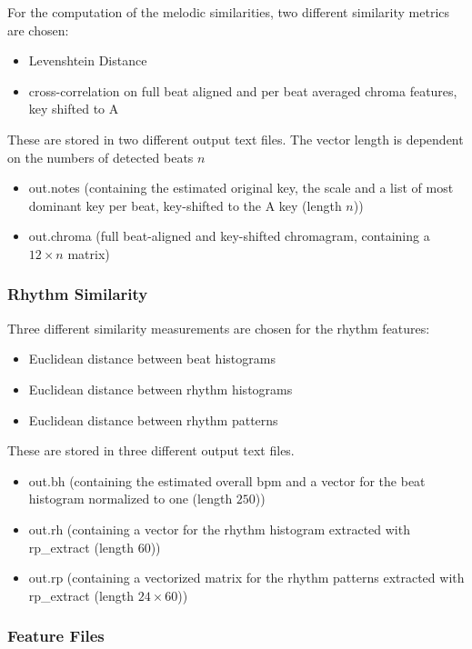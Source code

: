 For the computation of the melodic similarities, two different similarity metrics are chosen: 
\begin{itemize}
	\setlength\itemsep{-0.5em}
	\item Levenshtein Distance 
	\item cross-correlation on full beat aligned and per beat averaged chroma features, key shifted to A
\end{itemize}
These are stored in two different output text files. The vector length is dependent on the numbers of detected beats $n$
\begin{itemize}
	\setlength\itemsep{-0.5em}
	\item out.notes (containing the estimated original key, the scale and a list of most dominant key per beat, key-shifted to the A key (length $n$))
	\item out.chroma (full beat-aligned and key-shifted chromagram, containing a $12 \times n$ matrix)
\end{itemize}


\subsubsection{Rhythm Similarity}

Three different similarity measurements are chosen for the rhythm features: 
\begin{itemize}
	\setlength\itemsep{-0.5em}
	\item Euclidean distance between beat histograms
	\item Euclidean distance between rhythm histograms
	\item Euclidean distance between rhythm patterns
\end{itemize}
These are stored in three different output text files.
\begin{itemize}
	\setlength\itemsep{-0.5em}
	\item out.bh (containing the estimated overall bpm and a vector for the beat histogram normalized to one (length $250$))
	\item out.rh (containing a vector for the rhythm histogram extracted with rp\_extract (length $60$))
	\item out.rp (containing a vectorized matrix for the rhythm patterns extracted with rp\_extract (length $24 \times 60$))
\end{itemize}

\subsubsection{Feature Files}

